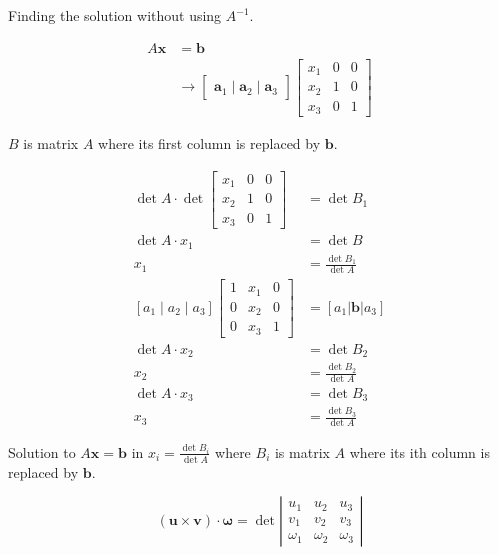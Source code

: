\documentclass[main.tex]{subfiles}
\begin{document}
Finding the solution without using $A^{-1}$.

$$
\begin{aligned}
A \bm{x} &= \bm{b} \\
&\rightarrow \left[\begin{array}{l}
\bm{a}_{1} \mid \bm{a}_{2} \mid \bm{a}_{3}
\end{array}\right]\left[\begin{array}{lll}
x_{1} & 0 & 0 \\
x_{2} & 1 & 0 \\
x_{3} & 0 & 1
\end{array}\right]
\end{aligned}
$$

$B$ is matrix $A$ where its first column is replaced by $\bm{b}$.

$$
\begin{aligned}
\operatorname{det} A \cdot \operatorname{det}\left[\begin{array}{lll}
x_{1} & 0 & 0 \\
x_{2} & 1 & 0 \\
x_{3} & 0 & 1
\end{array}\right] &= \operatorname{det} B_{1}\\
\operatorname{det} A \cdot x_{1} &= \operatorname{det} B\\
x_{1} &= \frac{\operatorname{det} B_{1}}{\operatorname{det} A}\\
\left[a_{1} \mid a_{2} \mid a_{3}\right]
\left[\begin{array}{lll} 1 & x_{1} & 0 \\ 0 & x_{2} & 0 \\ 0 & x_{3} & 1\end{array}\right]
&=\left[a_1|\bm{b}|a_3\right]\\
\operatorname{det} A \cdot x_2 &= \operatorname{det} B_{2}\\ 
x_{2} &= \frac{\operatorname{det} B_{2}}{\operatorname{det} A}\\
\operatorname{det} A \cdot x_{3} &= \operatorname{det} B_{3}\\
x_{3} &= \frac{\operatorname{det} B_{3}}{\operatorname{det} A}
\end{aligned}
$$

Solution to $A \bm{x} = \bm{b}$ in $x_{i}=\frac{\operatorname{det} B_{i}}{\operatorname{det}A}$ where $B_{i}$ is matrix $A$ where its ith column is replaced by $\bm{b}$.

$$
\left(\bm{u} \times \bm{v} \right) \cdot \bm{\omega} = \operatorname{det}\left|\begin{array}{lll}
u_1 & u_2 & u_3 \\
v_1 & v_2 & v_3 \\
\omega_{1} & \omega_{2} & \omega_{3}
\end{array}\right|
$$
\end{document}
